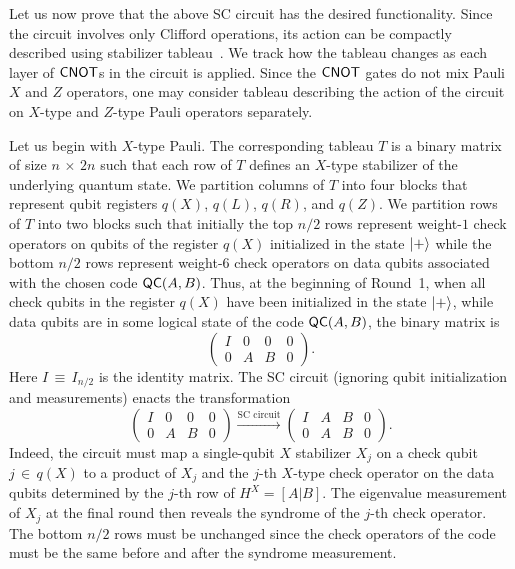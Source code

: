 \documentclass{article}
\begin{document}
Let us now prove that the above SC circuit has the desired functionality.  Since the circuit involves only Clifford operations, its action can be compactly described using stabilizer tableau~\cite{aaronson2004improved}.  We track how the tableau changes as each layer of $\mathsf{CNOT}$s in the circuit is applied.  Since the $\mathsf{CNOT}$ gates do not mix Pauli $X$ and $Z$ operators, one may consider tableau describing the action of the circuit on $X$-type and $Z$-type Pauli operators separately.  

Let us begin with $X$-type Pauli.  The corresponding tableau $T$ is a binary matrix of size $n\,{\times}\, 2n$ such that each row of $T$ defines an $X$-type stabilizer of the underlying quantum state.  We partition columns of $T$ into four blocks that represent qubit registers $q(X)$, $q(L)$, $q(R)$, and $q(Z)$.  We partition rows of $T$ into two blocks such that initially the top $n/2$ rows represent weight-$1$ check operators on qubits of the register $q(X)$ initialized in the state $|+\rangle$ while the bottom $n/2$ rows represent weight-$6$ check operators on data qubits associated with the chosen code $\mathsf{QC}(A,B)$. 
Thus, at the beginning of Round~1, when all check qubits in the register $q(X)$ have been initialized in the state $|+\rangle$, while data qubits are in some logical state of the code $\mathsf{QC}(A,B)$, the binary matrix is 
\[
\begin{pmatrix}
I & 0 & 0 & 0 \\
0 & A & B & 0
\end{pmatrix}.
\]
Here $I\,{\equiv}\, I_{n/2}$ is the identity matrix. 
The SC circuit (ignoring qubit initialization and measurements) enacts the transformation
\[
\begin{pmatrix}
I & 0 & 0 & 0 \\
0 & A & B & 0
\end{pmatrix}
\xrightarrow{\text{SC circuit}}
\begin{pmatrix}
I & A & B & 0 \\
0 & A & B & 0 
\end{pmatrix}.
\]
Indeed, the circuit must map a single-qubit $X$ stabilizer $X_j$ on a check qubit $j\,{\in}\, q(X)$ to a product of $X_j$ and the $j$-th $X$-type check operator on the data qubits determined by the $j$-th row of $H^X=[A|B]$.
The eigenvalue measurement of $X_j$ at the final round then reveals the syndrome of the $j$-th check operator.
The bottom $n/2$ rows must be unchanged since the check operators of the code must be the same before and after the syndrome measurement.
\end{document}
